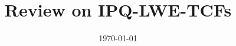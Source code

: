 \documentclass[aps, amsmath, amssymb, nofootinbib, superscriptaddress, longbibliography, floatfix, eqsecnum, rmp, twocolumn]{revtex4-2}
\begin{document}
\title{Review on IPQ-LWE-TCFs}

%

\date{\today}

\frenchspacing



\maketitle

\tableofcontents







 \label{references}
\end{document}
